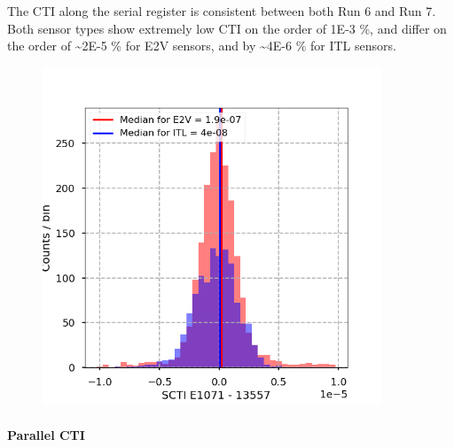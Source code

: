 The CTI along the serial register is consistent between both Run 6 and
Run 7. Both sensor types show extremely low CTI on the order of 1E-3 \%,
and differ on the order of \textasciitilde2E-5 \% for E2V sensors, and
by \textasciitilde4E-6 \% for ITL sensors.

\begin{figure}
\begin{centering}
\includegraphics[width=0.9\textwidth]{sections/figures/baselineCharacterization/SCTI_13557_E1071_diff.png}
\end{centering}
\end{figure}

\paragraph{Parallel CTI}\label{parallel-cti}

